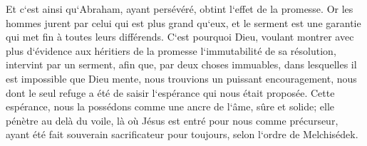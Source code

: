 \verse Et c`est ainsi qu`Abraham, ayant persévéré, obtint l`effet de la promesse. 
\verse Or les hommes jurent par celui qui est plus grand qu`eux, et le serment est une garantie qui met fin à toutes leurs différends. 
\verse C`est pourquoi Dieu, voulant montrer avec plus d`évidence aux héritiers de la promesse l`immutabilité de sa résolution, intervint par un serment, 
\verse afin que, par deux choses immuables, dans lesquelles il est impossible que Dieu mente, nous trouvions un puissant encouragement, nous dont le seul refuge a été de saisir l`espérance qui nous était proposée. 
\verse Cette espérance, nous la possédons comme une ancre de l`âme, sûre et solide; elle pénètre au delà du voile, 
\verse là où Jésus est entré pour nous comme précurseur, ayant été fait souverain sacrificateur pour toujours, selon l`ordre de Melchisédek. 

